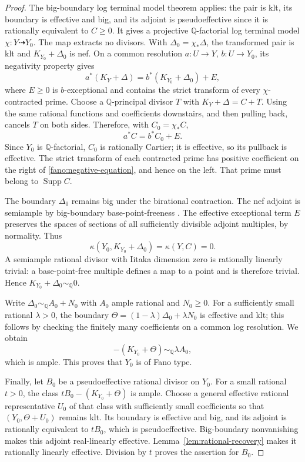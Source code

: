 \begin{proof}
The big-boundary log terminal model theorem
\cite[Theorem~1.1]{BCHM2010} applies: the pair is klt, its boundary
is effective and big, and its adjoint is pseudoeffective since it
is rationally equivalent to $C\geq0$.  It gives a projective
$\mathbb Q$-factorial log terminal model $\chi:Y\dashrightarrow Y_0$.
The map extracts no divisors.  With $\Delta_0=\chi_*\Delta$, the
transformed pair is klt and $K_{Y_0}+\Delta_0$ is nef.  On a common
resolution $a:U\to Y$, $b:U\to Y_0$, its negativity property
\cite[Definitions~3.6.1 and~3.6.6]{BCHM2010} gives
\[
 a^*(K_Y+\Delta)=b^*(K_{Y_0}+\Delta_0)+E,
\]
where $E\geq0$ is $b$-exceptional and contains the strict transform
of every $\chi$-contracted prime.  Choose a $\mathbb Q$-principal
divisor $T$ with $K_Y+\Delta=C+T$.  Using the same rational
functions and coefficients downstairs, and then pulling back,
cancels $T$ on both sides.  Therefore, with $C_0=\chi_*C$,
\begin{equation}\label{fano:negative-equation}
 a^*C=b^*C_0+E.
\end{equation}
Since $Y_0$ is $\mathbb Q$-factorial, $C_0$ is rationally Cartier;
it is effective, so its pullback is effective.  The strict transform
of each contracted prime has positive coefficient on the right
of \eqref{fano:negative-equation}, and hence on the left.  That
prime must belong to $\operatorname{Supp}C$.

The boundary $\Delta_0$ remains big under the birational contraction.
The nef adjoint is semiample by big-boundary base-point-freeness
\cite[Corollary~3.9.2]{BCHM2010}.  The effective exceptional
term $E$ preserves the spaces of sections of all sufficiently
divisible adjoint multiples, by normality.  Thus
\[
 \kappa(Y_0,K_{Y_0}+\Delta_0)=\kappa(Y,C)=0.
\]
A semiample rational divisor with Iitaka dimension zero is rationally
linearly trivial: a base-point-free multiple defines a map to a
point and is therefore trivial.  Hence
$K_{Y_0}+\Delta_0\sim_{\mathbb Q}0$.

Write $\Delta_0\sim_{\mathbb Q}A_0+N_0$ with $A_0$ ample rational
and $N_0\geq0$.  For a sufficiently small rational $\lambda>0$, the
boundary $\Theta=(1-\lambda)\Delta_0+\lambda N_0$ is effective and
klt; this follows by checking the finitely many coefficients on a
common log resolution.  We obtain
\[
 -(K_{Y_0}+\Theta)\sim_{\mathbb Q}\lambda A_0,
\]
which is ample.  This proves that $Y_0$ is of Fano type.

Finally, let $B_0$ be a pseudoeffective rational divisor on $Y_0$.
For a small rational $t>0$, the class
$tB_0-(K_{Y_0}+\Theta)$ is ample.  Choose a general effective
rational representative $U_0$ of that class with sufficiently small
coefficients so that $(Y_0,\Theta+U_0)$ remains klt.  Its boundary
is effective and big, and its adjoint is rationally equivalent to
$tB_0$, which is pseudoeffective.  Big-boundary nonvanishing
\cite[Theorem~D]{BCHM2010} makes this adjoint real-linearly effective.
Lemma~\ref{lem:rational-recovery} makes it rationally linearly
effective.  Division by $t$ proves the assertion for $B_0$.
\end{proof}

